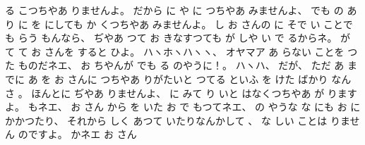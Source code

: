 る
こつちやあ
りませんよ。
%
だから
に
や
に%
つちやあ
みませんよ、
%
でも
%
の
あり
に
を
にしても
か
くつちやあ
みませんよ。
%
し
お
さんの
に
そで
い
ことでも
らう
もんなら、
%
ぢやあ
つて
お
きなすつても
が
しや
い
で
るからネ。
%
が
て
て
お
さんを
すると
%
ひよ。
%
ハヽホヽハヽヽ、
%
オヤマア
あ
らない
ことを
つた
ものだネエ、
%
お
ちやんが
でも
る
のやうに！。
%
ハヽハ、
だが、
%
ただ%
あ
までに
あ
を
お
さんに
つちやあ
りがたいと
つてる
といふ
を
けた
ばかり
なんさ
。
%
%
ほんとに
ぢやあ
りませんよ、
%
に
みて
り
いと
はなくつちやあ
が
りますよ。
%
もネエ、
%
お
さん
から
を
いた
お
で
もつてネエ、
%
の
やうな
な
にも
お
に
かかつたり、%
%
それから
しく
あつて
いたりなんかして
、
%
%
な
しい
ことは
りません
のですよ。
%
かネエ
お
さん
